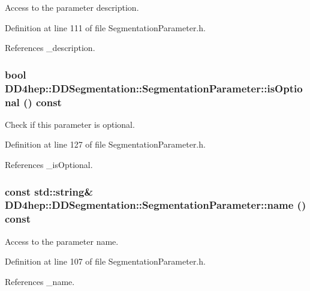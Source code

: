 Access to the parameter description. 

Definition at line 111 of file SegmentationParameter.h.

References \_\-description.\hypertarget{class_d_d4hep_1_1_d_d_segmentation_1_1_segmentation_parameter_ab364e7b4fd769637e72d5a47f3f0d3b6}{
\subsubsection[{isOptional}]{\setlength{\rightskip}{0pt plus 5cm}bool DD4hep::DDSegmentation::SegmentationParameter::isOptional () const}}
\label{class_d_d4hep_1_1_d_d_segmentation_1_1_segmentation_parameter_ab364e7b4fd769637e72d5a47f3f0d3b6}


Check if this parameter is optional. 

Definition at line 127 of file SegmentationParameter.h.

References \_\-isOptional.\hypertarget{class_d_d4hep_1_1_d_d_segmentation_1_1_segmentation_parameter_a254647e2a7cb362a8257c378fd85422c}{
\subsubsection[{name}]{\setlength{\rightskip}{0pt plus 5cm}const std::string\& DD4hep::DDSegmentation::SegmentationParameter::name () const}}
\label{class_d_d4hep_1_1_d_d_segmentation_1_1_segmentation_parameter_a254647e2a7cb362a8257c378fd85422c}


Access to the parameter name. 

Definition at line 107 of file SegmentationParameter.h.

References \_\-name.

